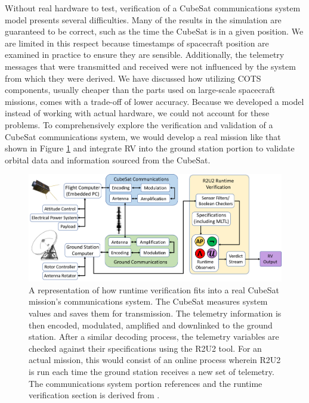 \documentclass[conf]{new-aiaa}
\begin{document}
Without real hardware to test, verification of a CubeSat communications system model presents several difficulties. Many of the results in the simulation are guaranteed to be correct, such as the time the CubeSat is in a given position. We are limited in this respect because timestamps of spacecraft position are examined in practice to ensure they are sensible. Additionally, the telemetry messages that were transmitted and received were not influenced by the system from which they were derived. We have discussed how utilizing COTS components, usually cheaper than the parts used on large-scale spacecraft missions, comes with a trade-off of lower accuracy. Because we developed a model instead of working with actual hardware, we could not account for these problems. To comprehensively explore the verification and validation of a CubeSat communications system, we would develop a real mission like that shown in Figure \ref{CubeSatRVDiagram} and integrate RV into the ground station portion to validate orbital data and information sourced from the CubeSat. 

\begin{figure}[!ht]
\centering
\includegraphics[width=1\textwidth]{Fig/InFlight_Overview.png}
\caption{A representation of how runtime verification fits into a real CubeSat mission's communications system. The CubeSat measures system values and saves them for transmission. The telemetry information is then encoded, modulated, amplified and downlinked to the ground station. After a similar decoding process, the telemetry variables are checked against their specifications using the R2U2 tool. For an actual mission, this would consist of an online process wherein R2U2 is run each time the ground station receives a new set of telemetry. The communications system portion references \cite{Asundi2013} and the runtime verification section is derived from \cite{ARS17}.}
\label{CubeSatRVDiagram}
\end{figure}
\end{document}
